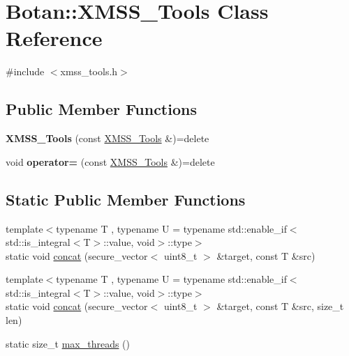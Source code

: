 \hypertarget{class_botan_1_1_x_m_s_s___tools}{}\section{Botan\+:\+:X\+M\+S\+S\+\_\+\+Tools Class Reference}
\label{class_botan_1_1_x_m_s_s___tools}


{\ttfamily \#include $<$xmss\+\_\+tools.\+h$>$}

\subsection*{Public Member Functions}
\begin{DoxyCompactItemize}
\item 
\mbox{\label{class_botan_1_1_x_m_s_s___tools_ad48168531c1602a79e7779e3b420b5e9}} 
{\bfseries X\+M\+S\+S\+\_\+\+Tools} (const \hyperlink{class_botan_1_1_x_m_s_s___tools}{X\+M\+S\+S\+\_\+\+Tools} \&)=delete
\item 
\mbox{\label{class_botan_1_1_x_m_s_s___tools_ac9672d0abf8d26d329aec9e0e8c056c0}} 
void {\bfseries operator=} (const \hyperlink{class_botan_1_1_x_m_s_s___tools}{X\+M\+S\+S\+\_\+\+Tools} \&)=delete
\end{DoxyCompactItemize}
\subsection*{Static Public Member Functions}
\begin{DoxyCompactItemize}
\item 
{\footnotesize template$<$typename T , typename U  = typename std\+::enable\+\_\+if$<$std\+::is\+\_\+integral$<$\+T$>$\+::value,                     void$>$\+::type$>$ }\\static void \hyperlink{class_botan_1_1_x_m_s_s___tools_add86e0bedfc6b9995c4d04dbe1ac8a2d}{concat} (secure\+\_\+vector$<$ uint8\+\_\+t $>$ \&target, const T \&src)
\item 
{\footnotesize template$<$typename T , typename U  = typename std\+::enable\+\_\+if$<$std\+::is\+\_\+integral$<$\+T$>$\+::value,                void$>$\+::type$>$ }\\static void \hyperlink{class_botan_1_1_x_m_s_s___tools_abe515ea4b81739fc09a6ca36c0487917}{concat} (secure\+\_\+vector$<$ uint8\+\_\+t $>$ \&target, const T \&src, size\+\_\+t len)
\item 
static size\+\_\+t \hyperlink{class_botan_1_1_x_m_s_s___tools_a38f92ca676cd550451c79f6e3271cf63}{max\+\_\+threads} ()
\end{DoxyCompactItemize}


